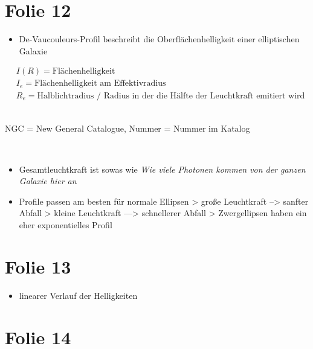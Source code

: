 \section{Folie 12}

\begin{itemize}
\item De-Vaucouleurs-Profil beschreibt die Oberflächenhelligkeit einer elliptischen Galaxie
\end{itemize}

\begin{align*}
&I(R) = \text{Flächenhelligkeit} \\
&I_e = \text{Flächenhelligkeit am Effektivradius} \\
&R_e = \text{Halblichtradius / Radius in der die Hälfte der Leuchtkraft emitiert wird}
\end{align*}

\hfill \\

NGC = New General Catalogue, Nummer = Nummer im Katalog

\hfill \\

\begin{itemize}
\item Gesamtleuchtkraft ist sowas wie \textit{Wie viele Photonen kommen von der ganzen Galaxie hier an}
\item Profile passen am besten für normale Ellipsen
\subitem > große Leuchtkraft --> sanfter Abfall
\subitem > kleine Leuchtkraft ---> schnellerer Abfall
\subitem > Zwergellipsen haben ein eher exponentielles Profil
\end{itemize}


\section{Folie 13}


\begin{itemize}
\item linearer Verlauf der Helligkeiten 
\end{itemize}


\newpage

\section{Folie 14}

